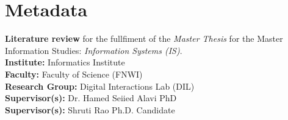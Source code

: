 \section*{Metadata}

\textbf{Literature review} for the fullfiment of the \emph{Master Thesis} for the Master Information Studies: \emph{Information Systems (IS)}. \\

{\parindent0pt \textbf{Institute:} Informatics Institute} \\
\textbf{Faculty:} Faculty of Science (FNWI) \\
\textbf{Research Group:} Digital Interactions Lab (DIL) \\
\textbf{Supervisor(s):} Dr. Hamed Seiied Alavi PhD \\
\textbf{Supervisor(s):} Shruti Rao Ph.D. Candidate \\
